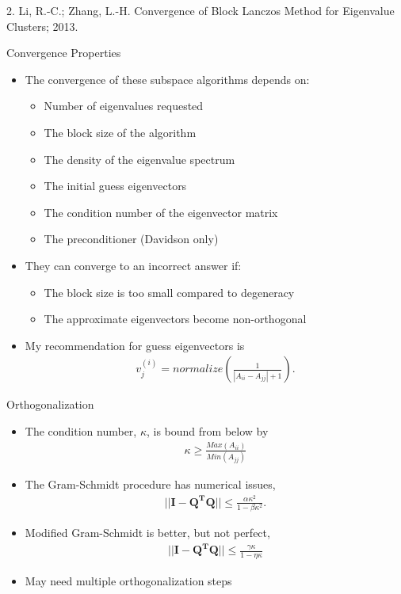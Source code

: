 \documentclass[10pt]{beamer}
\begin{document}
{{{{{{{{{{{{ 2. Li, R.-C.; Zhang, L.-H. Convergence of Block Lanczos Method for Eigenvalue Clusters; 2013.}
\begin{frame}{Convergence Properties}
	\begin{itemize}[<+->]
		\item{The convergence of these subspace algorithms depends on:}
		\begin{itemize}
			\item{\alert{Number of eigenvalues} requested}
			\item{The \alert{block size} of the algorithm}
			\item{The \alert{density} of the eigenvalue spectrum}
			\item{The \alert{initial guess} eigenvectors}
			\item{The \alert{condition number} of the eigenvector matrix}
			\item{The \alert{preconditioner} (Davidson only)}
		\end{itemize}
		\item{They can \alert{converge to an incorrect answer} if:}
		\begin{itemize}
			\item{The block size is too small compared to degeneracy}
			\item{The approximate eigenvectors become non-orthogonal}
		\end{itemize}
		\item{My recommendation for guess eigenvectors is
		\begin{eqnarray}
			v_j^{(i)} = normalize\left(\frac{1}{|A_{ii} - A_{jj}| + 1} \right).
		\end{eqnarray}
		}
	\end{itemize}
\end{frame}


{%
\begin{frame}{Orthogonalization}
	\begin{itemize}
		\item{The condition number, $\kappa$, is bound from below by
			\begin{eqnarray}
				\kappa \geq \frac{Max(A_{ii})}{Min(A_{jj})}
			\end{eqnarray}
		}
		\item{The Gram-Schmidt procedure has numerical issues,
			\begin{eqnarray}
				||\mathbf{I} - \mathbf{Q^TQ}|| \leq \frac{\alpha\kappa^2}{1-\beta\kappa^2}.
			\end{eqnarray}
		}
		\item{Modified Gram-Schmidt is better, but not perfect,
			\begin{eqnarray}
				||\mathbf{I} - \mathbf{Q^TQ}|| \leq \frac{\gamma\kappa}{1-\eta\kappa}
			\end{eqnarray}
		}
		\item{May need multiple orthogonalization steps}
	\end{itemize}


\end{frame}}}}}}}}}}}}}
\end{document}
